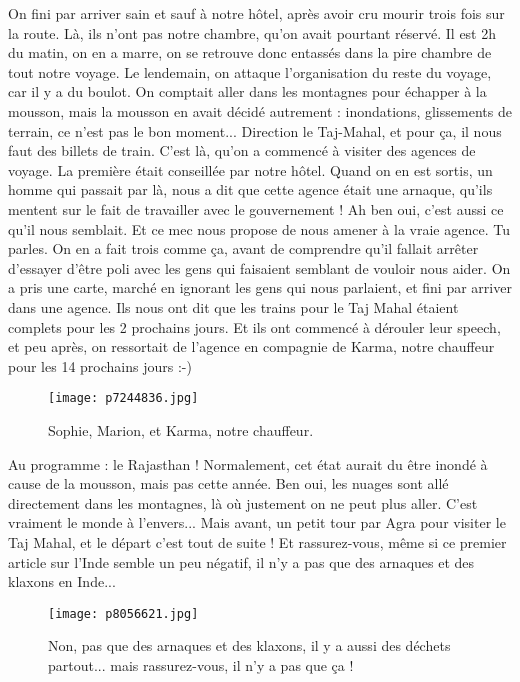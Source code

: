 \documentclass{book}
\begin{document}
On fini par arriver sain et sauf à notre hôtel, après avoir cru mourir trois fois sur la route. Là, ils n'ont pas notre chambre, qu'on avait pourtant réservé. Il est 2h du matin, on en a marre, on se retrouve donc entassés dans la pire chambre de tout notre voyage. Le lendemain, on attaque l'organisation du reste du voyage, car il y a du boulot. On comptait aller dans les montagnes pour échapper à la mousson, mais la mousson en avait décidé autrement : inondations, glissements de terrain, ce n'est pas le bon moment... Direction le Taj-Mahal, et pour ça, il nous faut des billets de train. C'est là, qu'on a commencé à visiter des agences de voyage. La première était conseillée  par notre hôtel. Quand on en est sortis, un homme qui passait par là, nous a dit que cette agence était une arnaque, qu'ils mentent sur le fait de travailler avec le gouvernement ! Ah ben oui, c'est aussi ce qu'il nous semblait. Et ce mec nous propose de nous amener à la vraie agence. Tu parles. On en a fait trois comme ça, avant de comprendre qu'il fallait arrêter d'essayer d'être poli avec les gens qui faisaient semblant de vouloir nous aider. On a pris une carte, marché en ignorant les gens qui nous parlaient, et fini par arriver dans une agence. Ils nous ont dit que les trains pour le Taj Mahal étaient complets pour les 2 prochains jours. Et ils ont commencé à dérouler leur speech, et peu après, on ressortait de l'agence en compagnie de Karma, notre chauffeur pour les 14 prochains jours :-)


\begin{figure}[h]
\centering
\texttt{[image: p7244836.jpg]}
\caption*{Sophie, Marion, et Karma, notre chauffeur.}
\end{figure}

Au programme : le Rajasthan ! Normalement, cet état aurait du être inondé à cause de la mousson, mais pas cette année. Ben oui, les nuages sont allé directement dans les montagnes, là où justement on ne peut plus aller. C'est vraiment le monde à l'envers... Mais avant, un petit tour par Agra pour visiter le Taj Mahal, et le départ c'est tout de suite ! Et rassurez-vous, même si ce premier article sur l'Inde semble un peu négatif, il n'y a pas que des arnaques et des klaxons en Inde...


\begin{figure}[h]
\centering
\texttt{[image: p8056621.jpg]}
\caption*{Non, pas que des arnaques et des klaxons, il y a aussi des déchets partout... mais rassurez-vous, il n'y a pas que ça !}
\end{figure}
\end{document}
